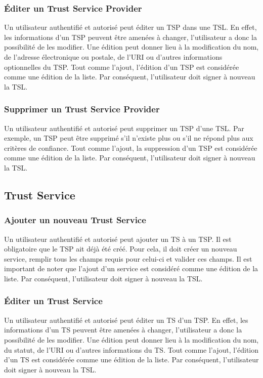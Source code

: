 \documentclass{tnreport}
\begin{document}
\subsubsection{Éditer un Trust Service Provider}
Un utilisateur authentifié et autorisé peut éditer un TSP dans une TSL. En effet, les informations d'un TSP peuvent être amenées à changer, l'utilisateur a donc la possibilité de les modifier. Une édition peut donner lieu à la modification du nom, de l'adresse électronique ou postale, de l'URI ou d'autres informations optionnelles du TSP. Tout comme l'ajout, l'édition d'un TSP est considérée comme une édition de la liste. Par conséquent, l'utilisateur doit signer à nouveau la TSL.
\subsubsection{Supprimer un Trust Service Provider}
Un utilisateur authentifié et autorisé peut supprimer un TSP d'une TSL. Par exemple, un TSP peut être supprimé s'il n'existe plus ou s'il ne répond plus aux critères de confiance. Tout comme l'ajout, la suppression d'un TSP est considérée comme une édition de la liste. Par conséquent, l'utilisateur doit signer à nouveau la TSL.

\subsection{Trust Service}
\subsubsection{Ajouter un nouveau Trust Service}
Un utilisateur authentifié et autorisé peut ajouter un TS à un TSP. Il est obligatoire que le TSP ait déjà été créé. Pour cela, il doit créer un nouveau service, remplir tous les champs requis pour celui-ci et valider ces champs. Il est important de noter que l'ajout d'un service est considéré comme une édition de la liste. Par conséquent, l'utilisateur doit signer à nouveau la TSL.
\subsubsection{Éditer un Trust Service}
Un utilisateur authentifié et autorisé peut éditer un TS d'un TSP. En effet, les informations d'un TS peuvent être amenées à changer, l'utilisateur a donc la possibilité de les modifier. Une édition peut donner lieu à la modification du nom, du statut, de l'URI ou d'autres informations du TS. Tout comme l'ajout, l'édition d'un TS est considérée comme une édition de la liste. Par conséquent, l'utilisateur doit signer à nouveau la TSL.
\end{document}

